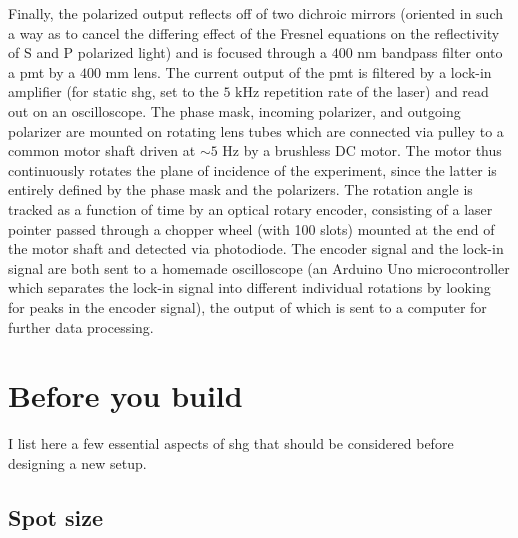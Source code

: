 Finally, the polarized output reflects off of two dichroic mirrors (oriented in such a way as to cancel the differing effect of the Fresnel equations on the reflectivity of S and P polarized light) and is focused through a $400$ \si{nm} bandpass filter onto a \gls{pmt} by a $400$ \si{mm} lens.
The current output of the \gls{pmt} is filtered by a lock-in amplifier (for static \gls{shg}, set to the $5$ \si{kHz} repetition rate of the laser) and read out on an oscilloscope.
The phase mask, incoming polarizer, and outgoing polarizer are mounted on rotating lens tubes which are connected via pulley to a common motor shaft driven at $\sim 5$ \si{Hz} by a brushless DC motor.
The motor thus continuously rotates the plane of incidence of the experiment, since the latter is entirely defined by the phase mask and the polarizers.
The rotation angle is tracked as a function of time by an optical rotary encoder, consisting of a laser pointer passed through a chopper wheel (with 100 slots) mounted at the end of the motor shaft and detected via photodiode.
The encoder signal and the lock-in signal are both sent to a homemade oscilloscope (an Arduino Uno microcontroller which separates the lock-in signal into different individual rotations by looking for peaks in the encoder signal), the output of which is sent to a computer for further data processing.

\section{Before you build}\label{sec:beforeyoubuild}

I list here a few essential aspects of \gls{shg} that should be considered before designing a new setup.

\subsection{Spot size}

